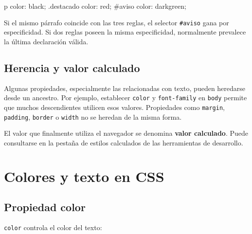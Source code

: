 \documentclass[11pt]{article}
\begin{document}
    \begin{csscodedark}
        p { color: black; }
        .destacado { color: red; }
        #aviso { color: darkgreen; }
    \end{csscodedark}

    Si el mismo párrafo coincide con las tres reglas, el selector
    \texttt{\#aviso} gana por especificidad. Si dos reglas poseen la misma
    especificidad, normalmente prevalece la última declaración válida.

    \subsection{Herencia y valor calculado}

    Algunas propiedades, especialmente las relacionadas con texto, pueden heredarse
    desde un ancestro. Por ejemplo, establecer \texttt{color} y
    \texttt{font-family} en \texttt{body} permite que muchos descendientes utilicen
    esos valores. Propiedades como \texttt{margin}, \texttt{padding},
    \texttt{border} o \texttt{width} no se heredan de la misma forma.


    El valor que finalmente utiliza el navegador se denomina \textbf{valor
        calculado}. Puede consultarse en la pestaña de estilos calculados de las
    herramientas de desarrollo.


    \section{Colores y texto en CSS}

    \subsection{Propiedad color}

    \texttt{color} controla el color del texto:
\end{document}
